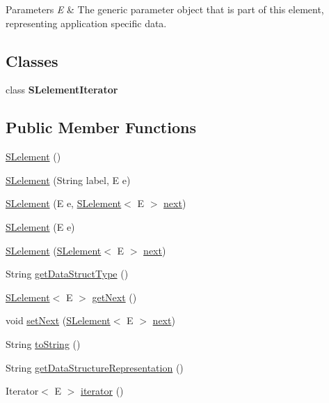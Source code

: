 \begin{DoxyParams}{Parameters}
{\em E} & The generic parameter object that is part of this element, representing application specific data. \\
\hline
\end{DoxyParams}
\subsection*{Classes}
\begin{DoxyCompactItemize}
\item 
class {\bfseries S\+Lelement\+Iterator}
\end{DoxyCompactItemize}
\subsection*{Public Member Functions}
\begin{DoxyCompactItemize}
\item 
\hyperlink{classbridges_1_1base_1_1_s_lelement_ab9c8a08dadd76d7e0c29d7c41cf277c4}{S\+Lelement} ()
\item 
\hyperlink{classbridges_1_1base_1_1_s_lelement_a8e32c9b9e8fc8f9f1eccb14b97e031e7}{S\+Lelement} (String label, E e)
\item 
\hyperlink{classbridges_1_1base_1_1_s_lelement_abc5e333fd2f3289eede108175908f97d}{S\+Lelement} (E e, \hyperlink{classbridges_1_1base_1_1_s_lelement}{S\+Lelement}$<$ E $>$ \hyperlink{classbridges_1_1base_1_1_s_lelement_abf61c96a74ad319d561c6952ea388e0e}{next})
\item 
\hyperlink{classbridges_1_1base_1_1_s_lelement_aa40c4c7bda4d7a852edb21a8ed537cae}{S\+Lelement} (E e)
\item 
\hyperlink{classbridges_1_1base_1_1_s_lelement_ab5b1c20ba1d1923fad0780052fb51c99}{S\+Lelement} (\hyperlink{classbridges_1_1base_1_1_s_lelement}{S\+Lelement}$<$ E $>$ \hyperlink{classbridges_1_1base_1_1_s_lelement_abf61c96a74ad319d561c6952ea388e0e}{next})
\item 
String \hyperlink{classbridges_1_1base_1_1_s_lelement_a8c48a2d34b238fa0ae7bf2d1ee58ea88}{get\+Data\+Struct\+Type} ()
\item 
\hyperlink{classbridges_1_1base_1_1_s_lelement}{S\+Lelement}$<$ E $>$ \hyperlink{classbridges_1_1base_1_1_s_lelement_a060c4671e05e3f20b16630343393b80d}{get\+Next} ()
\item 
void \hyperlink{classbridges_1_1base_1_1_s_lelement_afdd42f03071b2614822b73729e1a5a1a}{set\+Next} (\hyperlink{classbridges_1_1base_1_1_s_lelement}{S\+Lelement}$<$ E $>$ \hyperlink{classbridges_1_1base_1_1_s_lelement_abf61c96a74ad319d561c6952ea388e0e}{next})
\item 
String \hyperlink{classbridges_1_1base_1_1_s_lelement_af0ec4da5b29d0f5ab6ab38e91cca51f9}{to\+String} ()
\item 
String \hyperlink{classbridges_1_1base_1_1_s_lelement_a2928f5e8640deaceeecf01adcd75669b}{get\+Data\+Structure\+Representation} ()
\item 
Iterator$<$ E $>$ \hyperlink{classbridges_1_1base_1_1_s_lelement_ab93c03af9d847d32e126d102c18aad9d}{iterator} ()
\end{DoxyCompactItemize}
